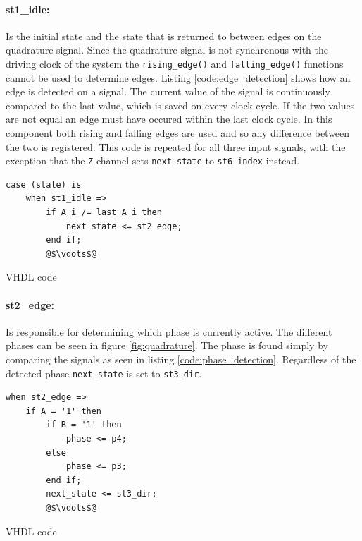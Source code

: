 \paragraph{st1\_idle:} %
Is the initial state and the state that is returned to between edges on the quadrature signal.
Since the quadrature signal is not synchronous with the driving clock of the system the \texttt{rising\_edge()} and \texttt{falling\_edge()} functions cannot be used to determine edges.
Listing \ref{code:edge_detection} shows how an edge is detected on a signal. 
The current value of the signal is continuously compared to the last value, which is saved on every clock cycle.
If the two values are not equal an edge must have occured within the last clock cycle.
In this component both rising and falling edges are used and so any difference between the two is registered.
This code is repeated for all three input signals, with the exception that the \texttt{Z} channel sets \texttt{next\_state} to \texttt{st6\_index} instead.

\begin{listing}[h]
\begin{verbatim}
case (state) is
	when st1_idle =>
		if A_i /= last_A_i then
	        next_state <= st2_edge;
	    end if;
	    @$\vdots$@
\end{verbatim}
\caption{VHDL code}
\label{code:edge_detection}
\end{listing}

\paragraph{st2\_edge:} %
Is responsible for determining which phase is currently active.
The different phases can be seen in figure \ref{fig:quadrature}.
The phase is found simply by comparing the signals as seen in listing \ref{code:phase_detection}.
Regardless of the detected phase \texttt{next\_state} is set to \texttt{st3\_dir}.
\begin{listing}[h]
\begin{verbatim}
when st2_edge =>
	if A = '1' then
	    if B = '1' then
	        phase <= p4;
	    else
	        phase <= p3;
	    end if;
	    next_state <= st3_dir;
	    @$\vdots$@
\end{verbatim}
\caption{VHDL code}
\label{code:phase_detection}
\end{listing}
